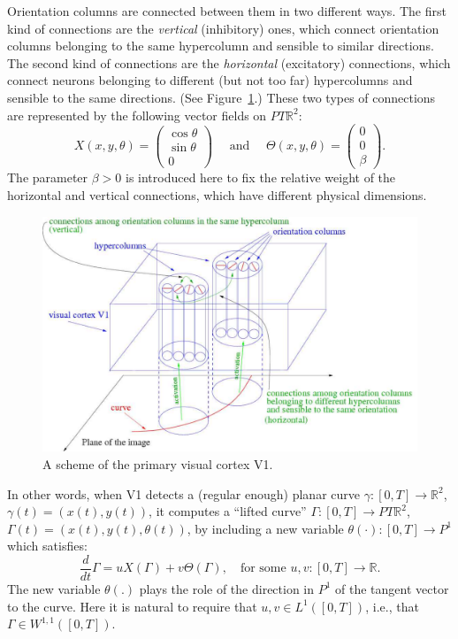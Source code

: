 \documentclass[proc]{edpsmath}
\newcommand{\R}{\mathbb{R}}
\newcommand{\PTR}{PT\R^2}
\begin{document}
Orientation columns are connected between them in two different ways. The first kind of connections are the  {\it vertical} (inhibitory) ones, which connect orientation columns belonging to the same hypercolumn and sensible to similar directions. The second kind of connections are the  {\it horizontal} (excitatory) connections, which connect neurons belonging to different (but not too far) hypercolumns and sensible to the same directions. (See Figure~\ref{fig:f-hyper-bis}.) These two types of connections are represented by the following vector fields on $PT\mathbb R^2$:
\begin{equation}
  X(x,y,\theta) = \left(\begin{array}{c} \cos\theta \\ \sin\theta\\0 \end{array}\right) \quad\text{ and }\quad
  \Theta(x,y,\theta) = \left(\begin{array}{c} 0 \\ 0\\ \beta \end{array}\right).
\end{equation}
The parameter $\beta>0$ is introduced here to fix the relative weight of the horizontal and vertical connections, which have different physical dimensions.



\begin{figure}
  \includegraphics[width = .7\textwidth]{f-hyper-bis.pdf}
  \caption{A scheme of the primary visual cortex V1.}
  \label{fig:f-hyper-bis}
\end{figure}


In other words, when V1 detects a (regular enough) planar curve $\gamma:[0,T]\to\R^2$, $\gamma(t)=(x(t),y(t))$, it computes a ``lifted curve''  $\Gamma:[0,T]\to\PTR$, $\Gamma(t) = (x(t),y(t),\theta(t))$, by including a new variable $\theta(\cdot):[0,T]\to P^1$ which satisfies:
\begin{equation}\label{eq-contrSR}
  \frac{d}{dt}\Gamma = u X(\Gamma) + v\Theta(\Gamma),\quad \text{for some } u,v:[0,T]\to\mathbb R.
\end{equation}
The new variable $\theta(.)$ plays the role of the direction in $P^1$ of the tangent vector to the curve. Here it is natural to require that $u,v\in L^1([0,T])$, i.e., that  $\Gamma\in W^{1,1}([0,T])$.
\end{document}
